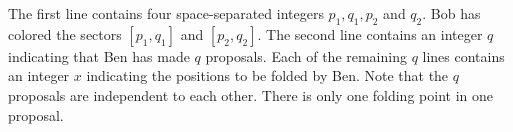 The first line contains four space-separated integers $p_1,q_1,p_2$ and $q_2$.
Bob has colored the sectors $[p_1,q_1]$ and $[p_2,q_2]$.
The second line contains an integer $q$ indicating that Ben has made
$q$ proposals. 
Each of the remaining $q$ lines contains an integer $x$ indicating 
the positions to be folded by Ben.
Note that the $q$ proposals are independent to each other. 
There is only one folding point in one proposal.
